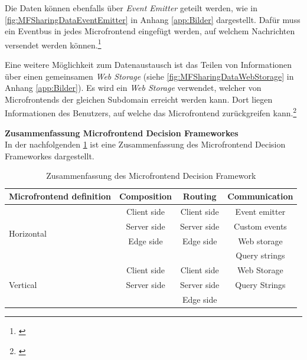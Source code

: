Die Daten können ebenfalls über \textit{Event Emitter} geteilt werden, wie in \cref{fig:MFSharingDataEventEmitter} in Anhang \ref{app:Bilder} dargestellt. Dafür muss ein \gls{Eventbus} in jedes Microfrontend eingefügt werden, auf welchem Nachrichten versendet werden können.\footnote{\cite[vgl.][33]{Mezzalira2021}}

Eine weitere Möglichkeit zum Datenaustausch ist das Teilen von Informationen über einen gemeinsamen \textit{Web Storage} (siehe \cref{fig:MFSharingDataWebStorage} in Anhang \ref{app:Bilder}). Es wird ein \textit{Web Storage} verwendet, welcher von Microfrontends der gleichen Subdomain erreicht werden kann. Dort liegen Informationen des Benutzers, auf welche das Microfrontend zurückgreifen kann.\footnote{\cite[vgl.][34]{Mezzalira2021}}

\textbf{Zusammenfassung Microfrontend Decision Frameworkes}\\
In der nachfolgenden \cref{tab:ZusammenfassunfMFFramework} ist eine Zusammenfassung des Microfrontend Decision Frameworkes dargestellt.

\begin{table}[hbt]
	\centering
	\begin{minipage}[t]{1\textwidth} %
		\caption{Zusammenfassung des Microfrontend Decision Framework} %
		\begin{tabular}{|
				l|ccc|}
			\midrule
			\textbf{Microfrontend definition\quad\quad\quad}&\textbf{Composition}&\textbf{Routing}&\textbf{Communication}\\
			\midrule
			\multirow{4}{*}{Horizontal}
			&Client side 	&Client side	&Event emitter\\ 
			&Server side 	&Server side	&Custom events\\
			&Edge side 		&Edge side		&Web storage\\
			&				&				&Query strings\\						
			\midrule
			\multirow{3}{*}{Vertical}
			&Client side	&Client side	&Web Storage\\ 
			&Server side	&Server side	&Query Strings\\
			& 				&Edge side		&\\
			\midrule
		\end{tabular}
		\newline
		\label{tab:ZusammenfassunfMFFramework}
	\end{minipage}
\end{table}

